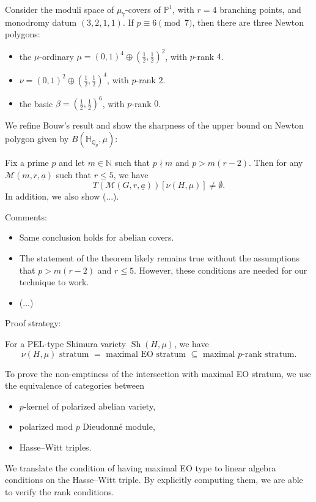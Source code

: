 \documentclass[reqno]{amsart} 
\begin{document}
\begin{example}
  Consider the moduli space of $\mu_7$-covers of $\mathbb{P}^1$, with $r =4$ branching points, and monodromy datum $(3, 2, 1, 1)$.  If $p \equiv 6 \pmod{7}$, then there are three Newton polygons:
  \begin{itemize}
  \item the $\mu$-ordinary $\mu =(0,1)^4 \oplus(\tfrac{1}{2}, \tfrac{1}{2})^2$, with $p$-rank $4$.
  \item $\nu =(0, 1)^2 \oplus(\tfrac{1}{2}, \tfrac{1}{2} )^4$, with $p$-rank $2$.
  \item the basic $\beta =(\tfrac{1}{2}, \tfrac{1}{2} )^6$, with $p$-rank $0$.
  \end{itemize}
\end{example}

We refine Bouw's result and show the sharpness of the upper bound on Newton polygon given by $B(\mathbb{H}_{\mathbb{Q}_p}, \mu)$:
\begin{theorem}
  Fix a prime $p$ and let $m \in \mathbb{N}$ such that $p \nmid m$ and $p > m(r - 2)$.  Then for any $\mathcal{M}(m, r, \underline{a})$ such that $r \leq 5$, we have
  \begin{equation*}
    T(\mathcal{M}(G, r, \underline{a}))[\nu(H, \mu)] \neq \emptyset.
  \end{equation*}
  In addition, we also show (...).
\end{theorem}

Comments:
\begin{itemize}
\item Same conclusion holds for abelian covers.
\item The statement of the theorem likely remains true without the assumptions that $p > m(r - 2)$ and $r \leq 5$.  However, these conditions are needed for our technique to work.
\item (...)
\end{itemize}

Proof strategy:
\begin{theorem}[Moonen, 2004]
  For a PEL-type Shimura variety $\operatorname{Sh}(H, \mu)$, we have
  \begin{equation*}
    \nu(H, \mu) \text{ stratum }
    =
    \text{ maximal EO stratum }
    \subseteq \text{ maximal $p$-rank stratum.}
  \end{equation*}
\end{theorem}
To prove the non-emptiness of the intersection with maximal EO stratum, we use the equivalence of categories between
\begin{itemize}
\item $p$-kernel of polarized abelian variety,
\item polarized mod $p$ Dieudonn{\'e} module, 
\item Hasse--Witt triples.
\end{itemize}
We translate the condition of having maximal EO type to linear algebra conditions on the Hasse--Witt triple.  By explicitly computing them, we are able to verify the rank conditions.
\end{document}
